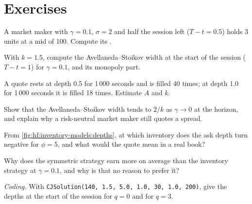 \section{Exercises}

\begin{exercise}[$\star$]\label{exo:hf:inventory-models:1}
A market maker with $\gamma=0.1$, $\sigma=2$ and half the session left ($T-t=0.5$) holds 3 units at a mid of 100. Compute its .
\end{exercise}

\begin{exercise}[$\star$]\label{exo:hf:inventory-models:2}
With $k=1.5$, compute the Avellaneda--Stoikov width at the start of the session ($T-t=1$) for $\gamma=0.1$, and its monopoly part.
\end{exercise}

\begin{exercise}[$\star$]\label{exo:hf:inventory-models:3}
A quote rests at depth 0.5 for 1\,000 seconds and is filled 40 times; at depth 1.0 for 1\,000 seconds it is filled 18 times. Estimate $A$ and $k$.
\end{exercise}

\begin{exercise}[$\star\star$]\label{exo:hf:inventory-models:4}
Show that the Avellaneda--Stoikov width tends to $2/k$ as $\gamma\to0$ at the horizon, and explain why a risk-neutral market maker still quotes a
spread.
\end{exercise}

\begin{exercise}[$\star\star$]\label{exo:hf:inventory-models:5}
From \cref{fig:hf:inventory-models:depths}, at which inventory does the ask depth turn negative for $\phi=5$, and what would the quote mean in a
real book?
\end{exercise}

\begin{exercise}[$\star\star$]\label{exo:hf:inventory-models:6}
Why does the symmetric strategy earn more on average than the inventory strategy at $\gamma=0.1$, and why is that no reason to prefer it?
\end{exercise}

\begin{exercise}[$\star\star\star$]\label{exo:hf:inventory-models:7}
\emph{Coding.} With \texttt{CJSolution(140, 1.5, 5.0, 1.0, 30, 1.0, 200)}, give the depths at the start of the session for $q=0$ and for $q=3$.
\end{exercise}


